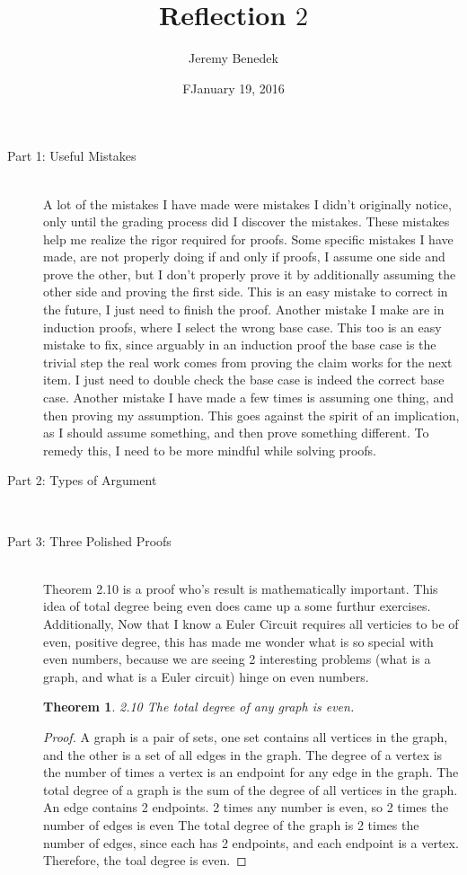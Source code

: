 \documentclass{article}
\title{Reflection $2$}
\author{Jeremy Benedek}
\date{FJanuary 19, 2016}
\newtheorem*{thm}{Theorem}
\begin{document}
\maketitle

\begin{description}
	\item[Part 1: Useful Mistakes] \hfill \\
		A lot of the mistakes I have made were mistakes I didn't originally notice, only until the grading process did I discover
		the mistakes. These mistakes help me realize the rigor required for proofs. Some specific mistakes I have made,
		are not properly doing if and only if proofs, I assume one side and prove the other, but I don't properly prove it by 
		additionally assuming the other side and proving the first side. This is an easy mistake to correct in the future, I 
		just need to finish the proof. Another mistake I make are in induction proofs, where I select
		the wrong base case. This too is an easy mistake to fix, since arguably in an induction proof the base case is the trivial step
		the real work comes from proving the claim works for the next item. I just need to double check the base case is indeed the correct
		base case. Another mistake I have made a few times is assuming one thing, and then proving my assumption. This goes against the 
		spirit of an implication, as I should assume something, and then prove something different. To remedy this, I need to be more mindful
		while solving proofs. 

	\item[Part 2: Types of Argument] \hfil \\
	
	\item[Part 3: Three Polished Proofs] \hfil \\
		Theorem 2.10 is a proof who's result is mathematically important. This idea of total degree being even does came up a some furthur exercises. Additionally, Now that I know a Euler Circuit requires all verticies to be of even, positive degree, this has made me wonder what is so special with even numbers, because we are seeing 2 interesting problems (what is a graph, and what is a Euler circuit) hinge on even numbers.
		
		\begin{thm}2.10     The total degree of any graph is even.\end{thm}
 		 \begin{proof}  A graph is a pair of sets, one set contains all vertices in the graph, and the other is a set of all edges in the graph.
       				The degree of a vertex is the number of times a vertex is an endpoint for any edge in the graph. 
				The total degree of a graph is the sum of the degree of all vertices in the graph. 
				An edge contains 2 endpoints. 
				2 times any number is even, so 2 times the number of edges is even 
				The total degree of the graph is 2 times the number of edges, since each has 2 endpoints, and each endpoint is a vertex. 
       				Therefore, the toal degree is even.  \end{proof}


\end{description}
\end{document}
